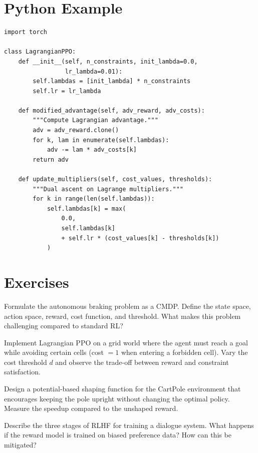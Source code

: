 \section{Python Example}
\label{sec:constrained:code}

\begin{codeblock}[title=\textbf{Lagrangian PPO (Simplified)}]
\begin{verbatim}
import torch

class LagrangianPPO:
    def __init__(self, n_constraints, init_lambda=0.0,
                 lr_lambda=0.01):
        self.lambdas = [init_lambda] * n_constraints
        self.lr = lr_lambda

    def modified_advantage(self, adv_reward, adv_costs):
        """Compute Lagrangian advantage."""
        adv = adv_reward.clone()
        for k, lam in enumerate(self.lambdas):
            adv -= lam * adv_costs[k]
        return adv

    def update_multipliers(self, cost_values, thresholds):
        """Dual ascent on Lagrange multipliers."""
        for k in range(len(self.lambdas)):
            self.lambdas[k] = max(
                0.0,
                self.lambdas[k]
                + self.lr * (cost_values[k] - thresholds[k])
            )
\end{verbatim}
\end{codeblock}

\section{Exercises}
\label{sec:constrained:exercises}

\begin{exercise}
Formulate the autonomous braking problem as a CMDP. Define the state
space, action space, reward, cost function, and threshold. What makes
this problem challenging compared to standard RL?
\end{exercise}

\begin{exercise}
Implement Lagrangian PPO on a grid world where the agent must reach a
goal while avoiding certain cells (cost $= 1$ when entering a forbidden
cell). Vary the cost threshold $d$ and observe the trade-off between
reward and constraint satisfaction.
\end{exercise}

\begin{exercise}
Design a potential-based shaping function for the CartPole environment
that encourages keeping the pole upright without changing the optimal
policy. Measure the speedup compared to the unshaped reward.
\end{exercise}

\begin{exercise}
Describe the three stages of RLHF for training a dialogue system.
What happens if the reward model is trained on biased preference data?
How can this be mitigated?
\end{exercise}
